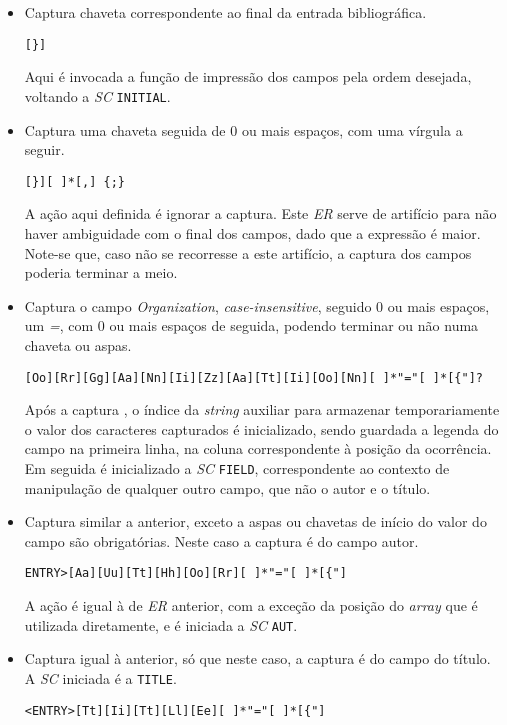 \begin{itemize}
\item Captura chaveta correspondente ao final da entrada bibliográfica.

\begin{verbatim}
[}] 
\end{verbatim}
Aqui é invocada a função de impressão dos campos pela ordem desejada, voltando
a \emph{SC} \texttt{INITIAL}.
\item Captura uma chaveta seguida de 0 ou mais espaços, com uma vírgula
	a seguir.

\begin{verbatim}
[}][ ]*[,] {;} 
\end{verbatim}

A ação aqui definida é ignorar a captura. Este \emph{ER} serve de artifício
para não haver ambiguidade com o final dos campos, dado que a expressão
é maior. Note-se que, caso não se recorresse a este artifício, a captura dos
campos poderia terminar a meio.

\item Captura o campo \emph{Organization}, \emph{case-insensitive}, seguido 0 ou
	mais espaços, um \emph{=}, com 0 ou mais espaços de seguida, podendo terminar
	ou não numa chaveta ou aspas.
\begin{verbatim}
[Oo][Rr][Gg][Aa][Nn][Ii][Zz][Aa][Tt][Ii][Oo][Nn][ ]*"="[ ]*[{"]? 
\end{verbatim}

Após a captura , o índice da \emph{string} auxiliar para armazenar
temporariamente o valor dos caracteres capturados é inicializado, sendo guardada
a legenda do campo na primeira linha, na coluna correspondente à posição da
ocorrência. Em seguida é inicializado a \emph{SC} \texttt{FIELD}, correspondente
ao contexto de manipulação de qualquer outro campo, que não o autor e o título.
                            
\item Captura similar a anterior, exceto a aspas ou chavetas de início do valor
	do campo são obrigatórias. Neste caso a captura é do campo autor.
\begin{verbatim}
ENTRY>[Aa][Uu][Tt][Hh][Oo][Rr][ ]*"="[ ]*[{"] 
\end{verbatim}

A ação é igual à de \emph{ER} anterior, com a exceção da posição do
\emph{array} que é utilizada diretamente, e é iniciada a \emph{SC} \texttt{AUT}.



\item Captura igual à anterior, só que neste caso, a captura é do campo do
	título. A \emph{SC} iniciada é a \texttt{TITLE}.
\begin{verbatim}
<ENTRY>[Tt][Ii][Tt][Ll][Ee][ ]*"="[ ]*[{"] 
\end{verbatim}


\end{itemize}
